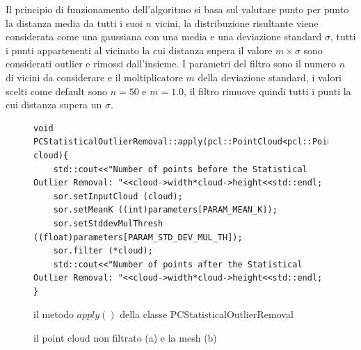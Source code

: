 \documentclass[a4paper,12pt]{article}
\begin{document}
		Il principio di funzionamento dell'algoritmo si basa sul valutare punto per punto la distanza media da tutti i suoi $n$
		vicini, la distribuzione risultante viene considerata come una gaussiana con una media e una deviazione standard
		$\sigma$, tutti i punti appartenenti al vicinato la cui distanza supera il valore $m\times\sigma$ sono considerati
		outlier e rimossi dall'insieme. 
		I parametri del filtro sono il numero $n$ di vicini da considerare e il moltiplicatore $m$ della deviazione standard, 
		i valori scelti come default sono $n=50$ e $m=1.0$, il filtro rimuove quindi tutti i punti la cui
		distanza supera un $\sigma$.
		\begin{figure}
		\begin{lstlisting}
void PCStatisticalOutlierRemoval::apply(pcl::PointCloud<pcl::PointXYZ>::Ptr cloud){
    std::cout<<"Number of points before the Statistical Outlier Removal: "<<cloud->width*cloud->height<<std::endl;
    sor.setInputCloud (cloud);
    sor.setMeanK ((int)parameters[PARAM_MEAN_K]);
    sor.setStddevMulThresh ((float)parameters[PARAM_STD_DEV_MUL_TH]);
    sor.filter (*cloud);
    std::cout<<"Number of points after the Statistical Outlier Removal: "<<cloud->width*cloud->height<<std::endl;
}
		\end{lstlisting}
		\caption{il metodo $apply()$ della classe PCStatisticalOutlierRemoval}
		\label{apply_sor}
		\end{figure}
		
		\begin{figure}[H]
    	\centering
    	\caption{il point cloud non filtrato (a) e la mesh (b)}
    	\label{fig:noise_comparison}
		\end{figure}
	\clearpage
\end{document}
